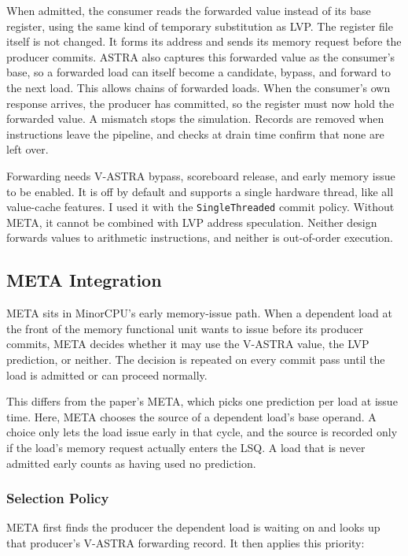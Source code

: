 When admitted, the consumer reads the forwarded value instead of its
base register, using the same kind of temporary substitution as LVP.
The register file itself is not changed. It forms its address and sends
its memory request before the producer commits. ASTRA also captures
this forwarded value as the consumer's base, so a forwarded load can
itself become a candidate, bypass, and forward to the next load. This
allows chains of forwarded loads. When the consumer's own response
arrives, the producer has committed, so the register must now hold
the forwarded value. A mismatch stops the simulation. Records are
removed when instructions leave the pipeline, and checks at drain time
confirm that none are left over.

Forwarding needs V-ASTRA bypass, scoreboard release, and early memory
issue to be enabled. It is off by default and supports a single
hardware thread, like all value-cache features. I used it with the
\texttt{SingleThreaded} commit policy. Without META, it cannot be
combined with LVP address speculation. Neither design forwards values
to arithmetic instructions, and neither is out-of-order execution.

\subsection{META Integration}
\label{sec:impl-meta}

META sits in MinorCPU's early memory-issue path. When a dependent load
at the front of the memory functional unit wants to issue before its
producer commits, META decides whether it may use the V-ASTRA value,
the LVP prediction, or neither. The decision is repeated on every
commit pass until the load is admitted or can proceed normally.

This differs from the paper's META, which picks one prediction per
load at issue time. Here, META chooses the source of a dependent
load's base operand. A choice only lets the load issue early in that
cycle, and the source is recorded only if the load's memory request
actually enters the LSQ. A load that is never admitted early counts
as having used no prediction.

\subsubsection{Selection Policy}

META first finds the producer the dependent load is waiting on and
looks up that producer's V-ASTRA forwarding record. It then applies
this priority:

